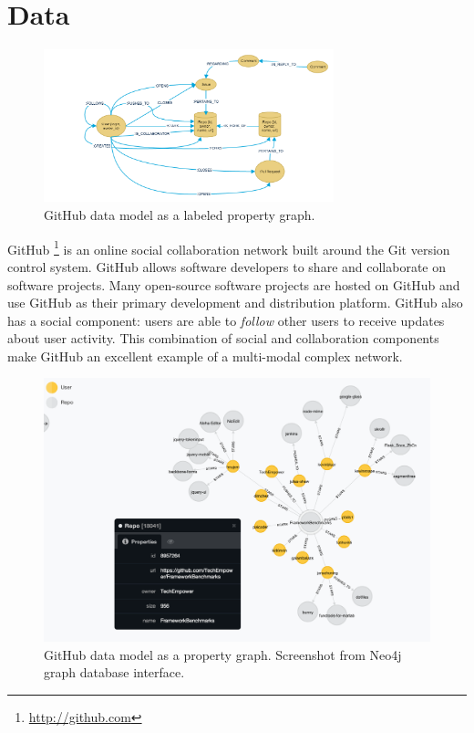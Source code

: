 
\section{Data}


\begin{figure}[H]
  \centering
  \includegraphics[width=0.75\textwidth]{images/githubdatamodel.png}
  \caption[GitHub graph data model]{GitHub data model as a labeled property graph.}
  \label{github_data_model}
\end{figure}

GitHub \footnote{\url{http://github.com}} is an online social collaboration network built around the Git version control system. GitHub allows software developers to share and collaborate on software projects. Many open-source software projects are hosted on GitHub and use GitHub as their primary development and distribution platform. GitHub also has a social component: users are able to \textit{follow} other users to receive updates about user activity. This combination of social and collaboration components make GitHub an excellent example of a multi-modal complex network. 


\begin{figure}[ht]
\vskip 0.2in
\begin{center}
\centerline{\includegraphics[width=0.75\columnwidth]{images/neo_screenshot.png}}
\caption{GitHub data model as a property graph. Screenshot from Neo4j graph database interface.}
\label{screenshot-data}
\end{center}
\vskip -0.2in
\end{figure} 


